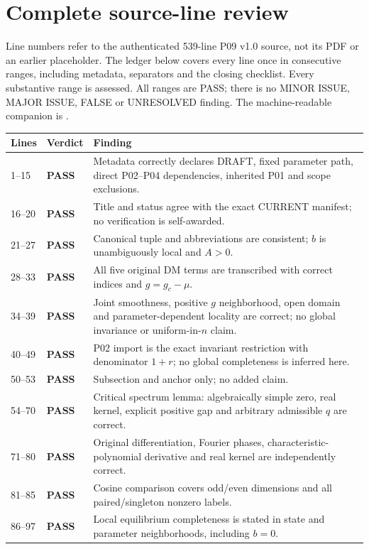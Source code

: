 \documentclass[11pt]{article}
\newcommand{\pass}{\textbf{PASS}}
\begin{document}
\section{Complete source-line review}
\label{sec:lines}
Line numbers refer to the authenticated 539-line P09 v1.0 source, not its
PDF or an earlier placeholder. The ledger below covers every line once
in consecutive ranges, including metadata, separators and the closing
checklist. Every substantive range is assessed. All ranges are PASS;
there is no MINOR ISSUE, MAJOR ISSUE, FALSE or UNRESOLVED finding.
The machine-readable companion is .

\begin{longtable}{@{}p{}p{}p{}@{}}
\toprule Lines & Verdict & Finding\\\midrule\endhead
1--15 & \pass & Metadata correctly declares DRAFT, fixed parameter path, direct P02--P04 dependencies, inherited P01 and scope exclusions.\\
16--20 & \pass & Title and status agree with the exact CURRENT manifest; no verification is self-awarded.\\
21--27 & \pass & Canonical tuple and abbreviations are consistent; $b$ is unambiguously local and $A>0$.\\
28--33 & \pass & All five original DM terms are transcribed with correct indices and $g=g_c-\mu$.\\
34--39 & \pass & Joint smoothness, positive $g$ neighborhood, open domain and parameter-dependent locality are correct; no global invariance or uniform-in-$n$ claim.\\
40--49 & \pass & P02 import is the exact invariant restriction with denominator $1+r$; no global completeness is inferred here.\\
50--53 & \pass & Subsection and anchor only; no added claim.\\
54--70 & \pass & Critical spectrum lemma: algebraically simple zero, real kernel, explicit positive gap and arbitrary admissible $q$ are correct.\\
71--80 & \pass & Original differentiation, Fourier phases, characteristic-polynomial derivative and real kernel are independently correct.\\
81--85 & \pass & Cosine comparison covers odd/even dimensions and all paired/singleton nonzero labels.\\
86--97 & \pass & Local equilibrium completeness is stated in state and parameter neighborhoods, including $b=0$.\\

\end{longtable}
\end{document}
